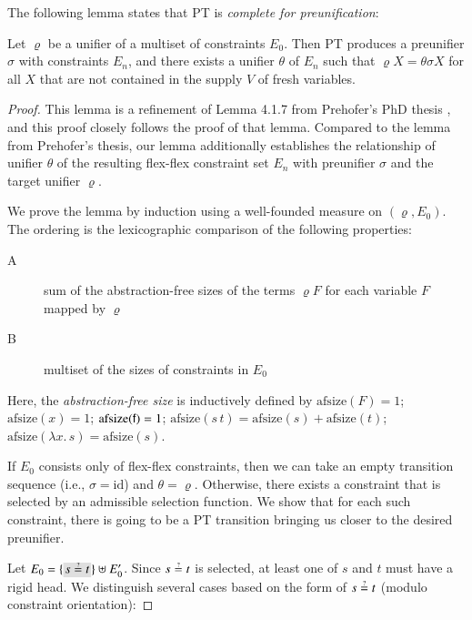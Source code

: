 The following lemma states that PT is \emph{complete for preunification}:
\begin{lemma}
  \label{unif:lemma:pt-complete}
  Let $\varrho$ be a unifier of a multiset of constraints $E_0$. Then PT produces a
  preunifier $\sigma$ with constraints $E_n$, and there exists a
  unifier $\theta$ of $E_n$ such that
  $\varrho X = \theta \sigma X$ for all $X$ that are not contained in the supply $V$ of fresh variables.
\end{lemma}
\begin{proof}
  This lemma is a refinement of Lemma 4.1.7 from Prehofer's PhD thesis
  \cite{cp-95-unifphd}, and this proof closely follows the proof of that lemma.
  Compared to the lemma from Prehofer's thesis, our lemma additionally establishes
  the relationship of unifier $\theta$ of the resulting flex-flex constraint
  set $E_n$ with preunifier $\sigma$ and the target unifier $\varrho$.

  We prove the lemma by induction 
  using a well-founded measure on $(\varrho,
  E_0)$. The ordering
  is the lexicographic comparison of the following properties:

  \begin{description}
    \item[A] sum of the abstraction-free sizes of the terms $\varrho F$ for each variable $F$ mapped by $\varrho$
    \item[B] multiset of the sizes of constraints in $E_0$
  \end{description}
Here, the \emph{abstraction-free size} is inductively defined by
$\text{afsize}(F) = 1$; $\text{afsize}(x) = 1$; $\text{afsize}(\mathsf{f}) = 1$;
$\text{afsize}(s\,t) = \text{afsize}(s) + \text{afsize}(t)$;
$\text{afsize}(\lambda x.\, s) = \text{afsize}(s)$.

  If $E_0$ consists only of flex-flex constraints, then we can take an empty
  transition sequence (i.e., $\sigma = \text{id}$) and $\theta = \varrho$.
  Otherwise, there exists a constraint that is selected by an
  admissible selection function. We show that for each such constraint, there is
  going to be a PT transition bringing us closer to the desired preunifier.

  Let $E_0 = \{\selected{s \unif t}\} \uplus E'_0$. Since $s \unif t$ is selected, at least
  one of $s$ and $t$ must have a rigid head. We distinguish several cases based on the
  form of $s \unif t$ (modulo constraint orientation):
  

\end{proof}
